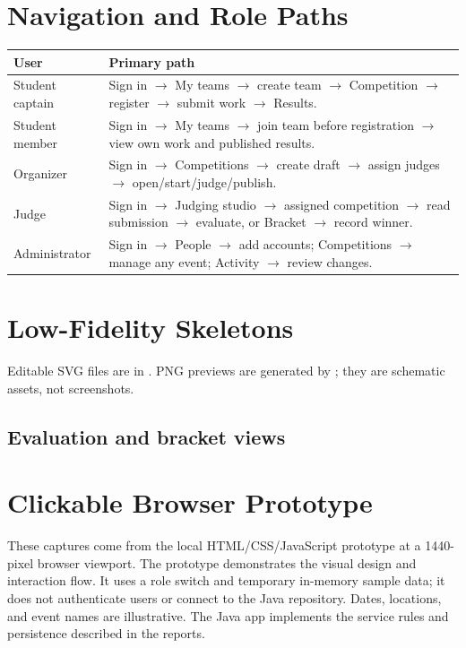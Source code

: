 \documentclass[12pt]{article}
\begin{document}
\section{Navigation and Role Paths}
\begin{tabularx}{\linewidth}{lY}\toprule User & Primary path\\\midrule
Student captain & Sign in $\rightarrow$ My teams $\rightarrow$ create team $\rightarrow$ Competition $\rightarrow$ register $\rightarrow$ submit work $\rightarrow$ Results.\\
Student member & Sign in $\rightarrow$ My teams $\rightarrow$ join team before registration $\rightarrow$ view own work and published results.\\
Organizer & Sign in $\rightarrow$ Competitions $\rightarrow$ create draft $\rightarrow$ assign judges $\rightarrow$ open/start/judge/publish.\\
Judge & Sign in $\rightarrow$ Judging studio $\rightarrow$ assigned competition $\rightarrow$ read submission $\rightarrow$ evaluate, or Bracket $\rightarrow$ record winner.\\
Administrator & Sign in $\rightarrow$ People $\rightarrow$ add accounts; Competitions $\rightarrow$ manage any event; Activity $\rightarrow$ review changes.\\\bottomrule\end{tabularx}
\clearpage\section{Low-Fidelity Skeletons}
Editable SVG files are in . PNG previews are generated by ; they are schematic assets, not screenshots.
\clearpage
\subsection*{Evaluation and bracket views}
\clearpage\section{Clickable Browser Prototype}
These captures come from the local HTML/CSS/JavaScript prototype at a 1440-pixel browser viewport. The prototype demonstrates the visual design and interaction flow. It uses a role switch and temporary in-memory sample data; it does not authenticate users or connect to the Java repository. Dates, locations, and event names are illustrative. The Java app implements the service rules and persistence described in the reports.
\clearpage
\end{document}
